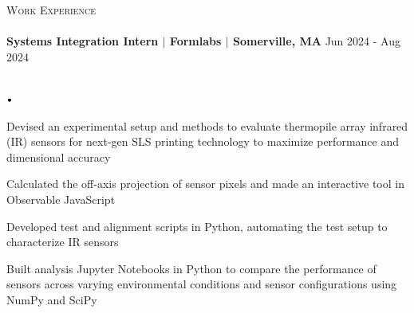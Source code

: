 \documentclass[11pt]{article}
\newcommand{\lineunder}{\vspace*{-8pt} \\ \hspace*{-18pt} \hrulefill \\}
\newcommand{\header}[1]{{\hspace*{-15pt}\vspace*{6pt} \textsc{#1}} \vspace*{-6pt} \lineunder}
\newcommand{\lbt}{\,\begin{picture}(-1,1)(-1,-3)\circle*{3}\end{picture}\ }
\newenvironment{achievements}{
    \begin{list}{$\lbt$}{
        \topsep -1pt
        \itemsep -1pt
        \addtolength{\leftmargin}{-0.15in}
    }
}
{
    \vspace*{0pt}
    \end{list}
}
\newcommand{\schoolwithcourses}[3]{
 \textbf{#1} \hfill{#2}\\
    \if\relax\detokenize{#3}\relax\else#3\\\fi
\vspace*{3pt}
}
\begin{document}
\header{Work Experience}

\schoolwithcourses{Systems Integration Intern $\vert$ Formlabs $\vert$ Somerville, MA}{Jun 2024 - Aug 2024}{}

\vspace{-2mm}
\begin{achievements}

\item Devised an experimental setup and methods to evaluate thermopile array infrared (IR) sensors for next-gen SLS printing technology to maximize performance and dimensional accuracy
\item Calculated the off-axis projection of sensor pixels and made an interactive tool in Observable JavaScript
\item Developed test and alignment scripts in Python, automating the test setup to characterize IR sensors
\item Built analysis Jupyter Notebooks in Python to compare the performance of sensors across varying environmental conditions and sensor configurations using NumPy and SciPy

\end{achievements}

\end{document}
